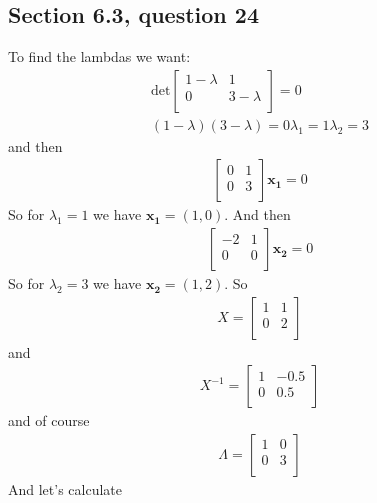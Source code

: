 \documentclass[a4paper,11pt]{article}
\newcommand{\mybf}[1]{\boldsymbol{#1}}
\begin{document}
\subsection*{Section 6.3, question 24}
To find the lambdas we want:
\begin{align*}
\text{det} 
\begin{bmatrix}
1-\lambda & 1 \\
0 & 3-\lambda \\
\end{bmatrix} = 0 \\
(1-\lambda)(3-\lambda)=0
\lambda_1 = 1
\lambda_2 = 3
\end{align*}
and then
\begin{align*}
\begin{bmatrix}
0 & 1 \\
0 & 3 \\
\end{bmatrix}
\mybf{x_1} = 0
\end{align*}
So for $\lambda_1=1$ we have $\mybf{x_1}=(1, 0)$.
And then
\begin{align*}
\begin{bmatrix}
-2 & 1 \\
0 & 0 \\
\end{bmatrix}
\mybf{x_2} = 0
\end{align*}
So for $\lambda_2=3$ we have $\mybf{x_2}=(1, 2)$.
So 
\begin{align*}
X = 
\begin{bmatrix}
1 & 1 \\
0 & 2 \\
\end{bmatrix}
\end{align*}
and 
\begin{align*}
X^{-1} = 
\begin{bmatrix}
1 & -0.5 \\
0 & 0.5 \\
\end{bmatrix}
\end{align*}
and of course 
\begin{align*}
\Lambda = 
\begin{bmatrix}
1 & 0 \\
0 & 3 \\
\end{bmatrix}
\end{align*}
And let's calculate
\end{document}
